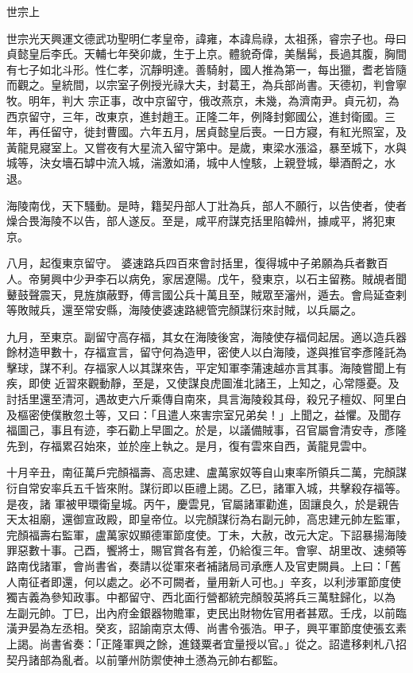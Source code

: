 
\begin{pinyinscope}

 世宗上



 世宗光天興運文德武功聖明仁孝皇帝，諱雍，本諱烏祿，太祖孫，睿宗子也。母曰貞懿皇后李氏。天輔七年癸卯歲，生于上京。體貌奇偉，美鬚髯，長過其腹，胸間有七子如北斗形。性仁孝，沉靜明達。善騎射，國人推為第一，每出獵，耆老皆隨而觀之。皇統間，以宗室子例授光祿大夫，封葛王，為兵部尚書。天德初，判會寧牧。明年，判大
 宗正事，改中京留守，俄改燕京，未幾，為濟南尹。貞元初，為西京留守，三年，改東京，進封趙王。正隆二年，例降封鄭國公，進封衛國。三年，再任留守，徙封曹國。六年五月，居貞懿皇后喪。一日方寢，有紅光照室，及黃龍見寢室上。又嘗夜有大星流入留守第中。是歲，東梁水漲溢，暴至城下，水與城等，決女墻石罅中流入城，湍激如涌，城中人惶駭，上親登城，舉酒酹之，水退。



 海陵南伐，天下騷動。是時，籍契丹部人丁壯為兵，部人不願行，以告使者，使者燥合畏海陵不以告，部人遂反。至是，咸平府謀克括里陷韓州，據咸平，將犯東京。



 八月，起復東京留守。
 婆速路兵四百來會討括里，復得城中子弟願為兵者數百人。帝舅興中少尹李石以病免，家居遼陽。戊午，發東京，以石主留務。賊覘者聞鼙鼓聲震天，見旌旗蔽野，傅言國公兵十萬且至，賊眾至瀋州，遁去。會烏延查剌等敗賊兵，還至常安縣，海陵使婆速路總管完顏謀衍來討賊，以兵屬之。



 九月，至東京。副留守高存福，其女在海陵後宮，海陵使存福伺起居。適以造兵器餘材造甲數十，存福宣言，留守何為造甲，密使人以白海陵，遂與推官李彥隆託為擊球，謀不利。存福家人以其謀來告，平定知軍李蒲速越亦言其事。海陵嘗聞上有疾，即使
 近習來觀動靜，至是，又使謀良虎圖淮北諸王，上知之，心常隱憂。及討括里還至清河，遇故吏六斤乘傳自南來，具言海陵殺其母，殺兄子檀奴、阿里白及樞密使僕散忽土等，又曰：「且遣人來害宗室兄弟矣！」上聞之，益懼。及聞存福圖己，事且有迹，李石勸上早圖之。於是，以議備賊事，召官屬會清安寺，彥隆先到，存福累召始來，並於座上執之。是月，復有雲來自西，黃龍見雲中。



 十月辛丑，南征萬戶完顏福壽、高忠建、盧萬家奴等自山東率所領兵二萬，完顏謀衍自常安率兵五千皆來附。謀衍即以臣禮上謁。乙巳，諸軍入城，共擊殺存福等。是夜，諸
 軍被甲環衛皇城。丙午，慶雲見，官屬諸軍勸進，固讓良久，於是親告天太祖廟，還御宣政殿，即皇帝位。以完顏謀衍為右副元帥，高忠建元帥左監軍，完顏福壽右監軍，盧萬家奴顯德軍節度使。丁未，大赦，改元大定。下詔暴揚海陵罪惡數十事。己酉，饗將士，賜官賞各有差，仍給復三年。會寧、胡里改、速頻等路南伐諸軍，會尚書省，奏請以從軍來者補諸局司承應人及官吏闕員。上曰：「舊人南征者即還，何以處之。必不可闕者，量用新人可也。」辛亥，以利涉軍節度使獨吉義為參知政事。中都留守、西北面行營都統完顏彀英將兵三萬駐歸化，以為
 左副元帥。丁巳，出內府金銀器物贍軍，吏民出財物佐官用者甚眾。壬戌，以前臨潢尹晏為左丞相。癸亥，詔諭南京太傅、尚書令張浩。甲子，興平軍節度使張玄素上謁。尚書省奏：「正隆軍興之餘，進錢粟者宜量授以官。」從之。詔遣移剌札八招契丹諸部為亂者。以前肇州防禦使神土懣為元帥右都監。




\end{pinyinscope}
